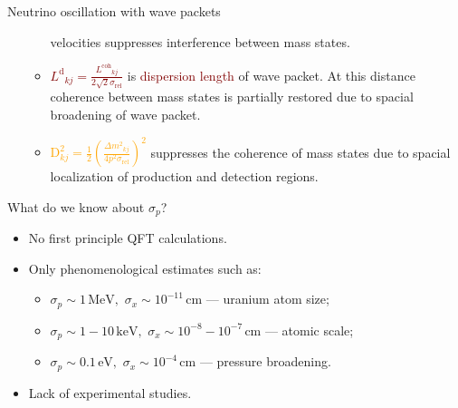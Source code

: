 \documentclass[usenames, dvipsnames]{beamer}
\newcommand{\Lcoh}{\ensuremath{L^{\text{coh}}}}
\newcommand{\Ld}{\ensuremath{L^{\text{d}}}}
\newcommand{\Dm}{\ensuremath{\Delta m^2}}
\newcommand{\Important}{\textcolor{BrickRed}}
\newcommand{\Orange}{\textcolor{Orange}}
\newcommand{\Maroon}{\textcolor{Maroon}}
\newcommand{\impitem}{\item[\Important{$\bullet$}]}
\newcommand{\orangeitem}{\item[\Orange{$\bullet$}]}
\newcommand{\pineitem}{\item[\Maroon{$\bullet$}]}
\newcommand{\sip}{\ensuremath{\sigma_p}}
\newcommand{\six}{\ensuremath{\sigma_x}}
\begin{document}
\begin{frame}[fragile]
\begin{columns}[T]
\begin{column}{.47\textwidth}
\begin{block}{Neutrino oscillation with wave packets}
\begin{itemize}
\begin{itemize}
            velocities suppresses interference between mass states.
        \pineitem \Maroon{$\Ld_{kj}  =
            \frac{\Lcoh_{kj}}{2\sqrt{2}\sigma_{\text{rel}}}$} is
            \Maroon{dispersion length} of wave packet. At this distance
             coherence between mass states is partially restored due to
             spacial broadening of wave packet.
         \orangeitem \Orange{\ensuremath{ \text{D}^2_{kj} =\frac{1}{2} \left(
             \frac{\Dm_{kj}}{4 p^2\sigma_\text{rel}} \right)^2}} 
         suppresses the coherence of mass states due to spacial localization of production and
             detection regions.
    \end{itemize}
  \end{itemize}
\end{block}


\begin{block}{What do we know about \sip?}
    \begin{itemize}
        \item No first principle QFT calculations.
        \item Only phenomenological estimates such as:
        \begin{itemize}
            \item $\sip \sim 1\, \text{MeV}, \,\, \six \sim 10^{-11}\, \text{cm}$
                --- uranium atom size;
            \item $\sip \sim 1-10 \, \text{keV}, \,\, \six \sim 10^{-8} -
                10^{-7} \, \text{cm}$ --- atomic scale;
            \item $\sip \sim 0.1 \, \text{eV}, \,\, \six \sim 10^{-4} \, \text{cm}$
                --- pressure broadening.
        \end{itemize}
        \impitem Lack of experimental studies.
    \end{itemize}
\end{block}


\end{column}
\end{columns}
\end{frame}
\end{document}
